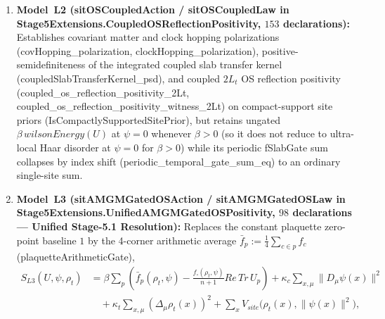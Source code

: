 \documentclass[american,11pt,letterpaper]{article}
\def\mathrm#1{#1}%
\def\texttt#1{#1}%
\def\emph#1{#1}%
\begin{document}
\begin{enumerate}[leftmargin=2em]
  \item \textbf{Model~L2 (\texttt{sitOSCoupledAction} / \texttt{sitOSCoupledLaw} in \texttt{Stage5\allowbreak{}Extensions.\allowbreak{}Coupled\allowbreak{}OSReflection\allowbreak{}Positivity}, $153$ declarations):} Establishes covariant matter and clock hopping polarizations (\texttt{cov\allowbreak{}Hopping\_\allowbreak{}polarization}, \texttt{clock\allowbreak{}Hopping\_\allowbreak{}polarization}), positive-semidefiniteness of the integrated coupled slab transfer kernel (\texttt{coupled\allowbreak{}Slab\allowbreak{}Transfer\allowbreak{}Kernel\_\allowbreak{}psd}), and coupled $2L_t$ OS reflection positivity (\texttt{coupled\_\allowbreak{}os\_\allowbreak{}reflection\_\allowbreak{}positivity\_\allowbreak{}2\allowbreak{}Lt}, \texttt{coupled\_\allowbreak{}os\_\allowbreak{}reflection\_\allowbreak{}positivity\_\allowbreak{}witness\_\allowbreak{}2\allowbreak{}Lt}) on compact-support site priors (\texttt{Is\allowbreak{}Compactly\allowbreak{}Supported\allowbreak{}Site\allowbreak{}Prior}), \emph{but} retains ungated $\beta\,\mathrm{wilsonEnergy}(U)$ at $\psi = 0$ whenever $\beta > 0$ (so it does not reduce to ultra-local Haar disorder at $\psi = 0$ for $\beta > 0$) while its periodic \texttt{fSlabGate} sum collapses by index shift (\texttt{periodic\_\allowbreak{}temporal\_\allowbreak{}gate\_\allowbreak{}sum\_\allowbreak{}eq}) to an ordinary single-site sum.
  \item \textbf{Model~L3 (\texttt{sitAMGMGatedOSAction} / \texttt{sitAMGMGatedOSLaw} in \texttt{Stage5\allowbreak{}Extensions.\allowbreak{}Unified\allowbreak{}AMGMGated\allowbreak{}OSPositivity}, $98$ declarations --- Unified Stage-5.1 Resolution):} Replaces the constant plaquette zero-point baseline $1$ by the 4-corner arithmetic average $\bar{f}_p := \frac{1}{4}\sum_{c\in p} f_c$ (\texttt{plaquette\allowbreak{}Arithmetic\allowbreak{}Gate}),
  \begin{align}
  S_{\mathrm{L3}}(U,\psi,\rho_t)
  &= \beta\sum_p\left(\bar{f}_p(\rho_t,\psi) - \frac{f_\square(\rho_t,\psi)}{n+1}\mathrm{Re}\,\mathrm{Tr}\,U_p\right)
    + \kappa_c\sum_{x,\mu}\|D_\mu\psi(x)\|^2 \nonumber\\
  &\quad + \kappa_t\sum_{x,\mu}(\Delta_\mu\rho_t(x))^2
    + \sum_x V_{\mathrm{site}}\bigl(\rho_t(x),\|\psi(x)\|^2\bigr),
  \label{eq:model_l3_amgm_action}
  \end{align}

\end{enumerate}
\end{document}
